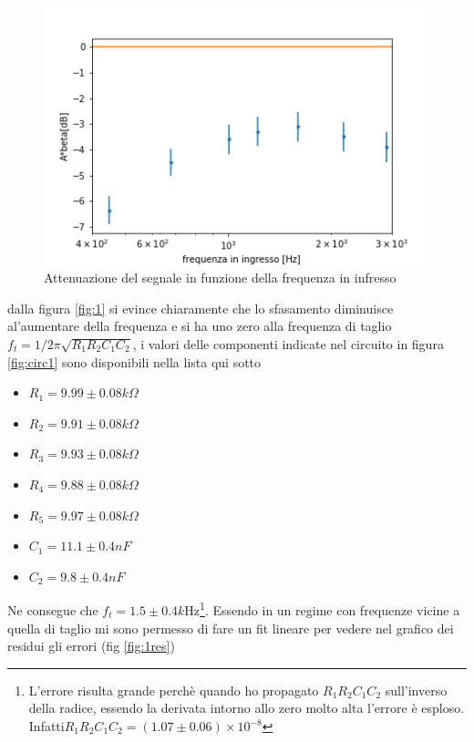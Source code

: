 \documentclass{article}
\begin{document}
	\begin{figure}[h!]
		\centering
		\includegraphics[width=\linewidth]{figure/2.png}
		\caption{Attenuazione del segnale in funzione della frequenza in infresso}
		\label{fig:2}
	\end{figure}
	dalla figura \ref{fig:1} si evince chiaramente che lo sfasamento diminuisce al'aumentare della frequenza e si ha uno zero alla frequenza di taglio $f_t=1/2\pi\sqrt{R_1R_2C_1C_2}$, i valori delle componenti indicate nel circuito in figura \ref{fig:circ1} sono disponibili nella lista qui sotto
	\begin{itemize}
		\item $R_1=9.99\pm0.08k\Omega$
		\item $R_2=9.91\pm0.08k\Omega$
		\item $R_3=9.93\pm0.08k\Omega$
		\item $R_4=9.88\pm0.08k\Omega$
		\item $R_5=9.97\pm0.08k\Omega$
		\item $C_1=11.1\pm0.4nF$
		\item $C_2=9.8\pm 0.4nF$
	\end{itemize}
	Ne consegue che $f_t=1.5\pm0.4 k$Hz\footnote{L'errore risulta grande perchè quando ho propagato $R_1R_2C_1C_2$ sull'inverso della radice, essendo la derivata intorno allo zero molto alta l'errore è esploso. Infatti\newline $R_1R_2C_1C_2=(1.07\pm 0.06)\times 10^{-8}$}. Essendo in un regime con frequenze vicine a quella di taglio mi sono permesso di fare un fit lineare per vedere nel grafico dei residui gli errori (fig \ref{fig:1res})\newline
\end{document}
